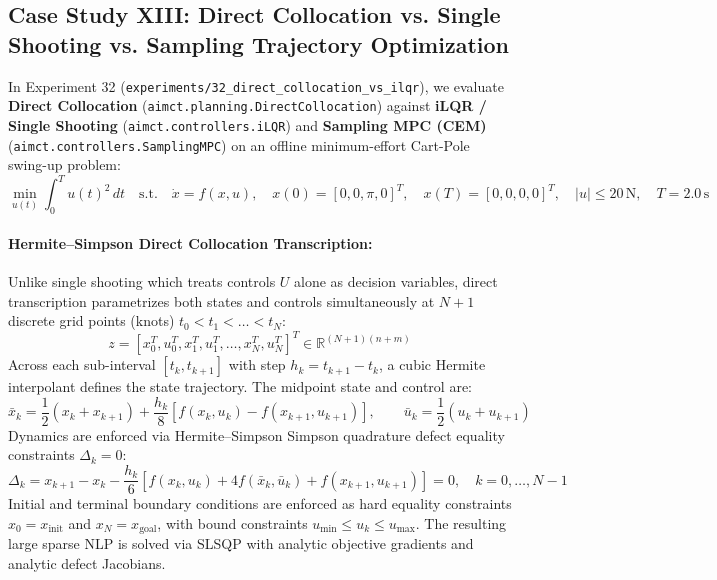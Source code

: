 \documentclass[11pt,a4paper]{article}
\begin{document}
\subsection{Case Study XIII: Direct Collocation vs. Single Shooting vs. Sampling Trajectory Optimization}

In Experiment 32 (\texttt{experiments/32\_direct\_collocation\_vs\_ilqr}), we evaluate \textbf{Direct Collocation} (\texttt{aimct.planning.DirectCollocation}) against \textbf{iLQR / Single Shooting} (\texttt{aimct.controllers.iLQR}) and \textbf{Sampling MPC (CEM)} (\texttt{aimct.controllers.SamplingMPC}) on an offline minimum-effort Cart-Pole swing-up problem:
\begin{equation}
\min_{u(t)} \int_0^T u(t)^2 \, dt \quad \text{s.t.} \quad \dot{x} = f(x, u), \quad x(0) = [0, 0, \pi, 0]^T, \quad x(T) = [0, 0, 0, 0]^T, \quad |u| \le 20\,\text{N}, \quad T = 2.0\,\text{s}
\end{equation}

\paragraph{Hermite--Simpson Direct Collocation Transcription:}
Unlike single shooting which treats controls $U$ alone as decision variables, direct transcription parametrizes both states and controls simultaneously at $N+1$ discrete grid points (knots) $t_0 < t_1 < \dots < t_N$:
\begin{equation}
z = \left[ x_0^T, u_0^T, x_1^T, u_1^T, \dots, x_N^T, u_N^T \right]^T \in \mathbb{R}^{(N+1)(n+m)}
\end{equation}
Across each sub-interval $[t_k, t_{k+1}]$ with step $h_k = t_{k+1} - t_k$, a cubic Hermite interpolant defines the state trajectory. The midpoint state and control are:
\begin{equation}
\bar{x}_k = \frac{1}{2}(x_k + x_{k+1}) + \frac{h_k}{8}\left[ f(x_k, u_k) - f(x_{k+1}, u_{k+1}) \right], \qquad \bar{u}_k = \frac{1}{2}(u_k + u_{k+1})
\end{equation}
Dynamics are enforced via Hermite--Simpson Simpson quadrature defect equality constraints $\Delta_k = 0$:
\begin{equation}
\Delta_k = x_{k+1} - x_k - \frac{h_k}{6}\left[ f(x_k, u_k) + 4 f(\bar{x}_k, \bar{u}_k) + f(x_{k+1}, u_{k+1}) \right] = 0, \quad k = 0, \dots, N-1
\end{equation}
Initial and terminal boundary conditions are enforced as hard equality constraints $x_0 = x_{\text{init}}$ and $x_N = x_{\text{goal}}$, with bound constraints $u_{\min} \le u_k \le u_{\max}$. The resulting large sparse NLP is solved via SLSQP with analytic objective gradients and analytic defect Jacobians.
\end{document}
